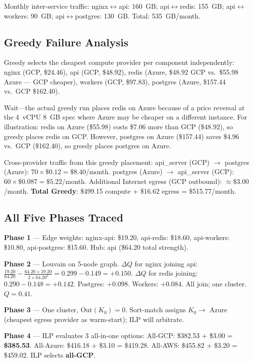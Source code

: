 \documentclass[sigconf,10pt]{acmart}
\begin{document}
Monthly inter-service traffic: nginx$\leftrightarrow$api: 160~GB;
api$\leftrightarrow$redis: 155~GB; api$\leftrightarrow$workers: 90~GB;
api$\leftrightarrow$postgres: 130~GB. Total: 535~GB/month.

\subsection{Greedy Failure Analysis}

Greedy selects the cheapest compute provider per component independently:
nginx (GCP, \$24.46), api (GCP, \$48.92), redis (Azure, \$48.92 GCP vs.\ \$55.98
Azure --- GCP cheaper), workers (GCP, \$97.83), postgres (Azure, \$157.44 vs.\
GCP \$162.40).

Wait---the actual greedy run places redis on Azure because of a price reversal
at the 4~vCPU 8~GB spec where Azure may be cheaper on a different instance.
For illustration: redis on Azure (\$55.98) costs \$7.06 more than GCP (\$48.92),
so greedy places redis on GCP.
However, postgres on Azure (\$157.44) saves \$4.96 vs.\ GCP (\$162.40), so
greedy places postgres on Azure.

Cross-provider traffic from this greedy placement:
api\_server (GCP) $\to$ postgres (Azure): $70 \times \$0.12 = \$8.40$/month.
postgres (Azure) $\to$ api\_server (GCP): $60 \times \$0.087 = \$5.22$/month.
Additional Internet egress (GCP outbound): $\approx\$3.00$/month.
\textbf{Total Greedy}: \$499.15 compute + \$16.62 egress = \$515.77/month.

\subsection{All Five Phases Traced}

\textbf{Phase 1} --- Edge weights: nginx-api: \$19.20, api-redis: \$18.60,
api-workers: \$10.80, api-postgres: \$15.60. Hub: api (\$64.20 total strength).

\textbf{Phase 2} --- Louvain on 5-node graph. $\Delta Q$ for nginx joining api:
$\frac{19.20}{64.20} - \frac{64.20 \times 19.20}{2 \times 64.20^2} = 0.299 - 0.149 = +0.150$.
$\Delta Q$ for redis joining: $0.290 - 0.148 = +0.142$. Postgres: $+0.098$.
Workers: $+0.084$. All join; one cluster. $Q = 0.41$.

\textbf{Phase 3} --- One cluster, $\text{Out}(K_0) = 0$. Sort-match assigns $K_0 \to$
Azure (cheapest egress provider as warm-start); ILP will arbitrate.

\textbf{Phase 4} --- ILP evaluates 3 all-in-one options:
All-GCP: \$382.53 + \$3.00 = \textbf{\$385.53}.
All-Azure: \$416.18 + \$3.10 = \$419.28.
All-AWS: \$455.82 + \$3.20 = \$459.02. ILP selects \textbf{all-GCP}.
\end{document}
